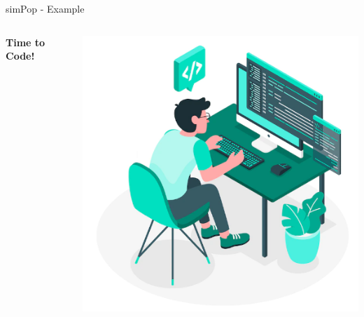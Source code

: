 \documentclass[
	aspectratio = 169
 ]{beamer}
\begin{document}





\begin{frame}{simPop - Example}

\begin{columns}
    \centering
    \Huge
    \textbf{Time to Code!}

    \centering
    \includegraphics[width=\linewidth]{Presentation TEX//gallery/coding.png}
\end{columns}

\end{frame}
\end{document}
